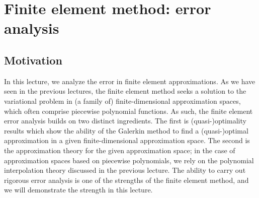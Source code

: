 \chapter{Finite element method: error analysis}

\disclaimer

\section{Motivation}
In this lecture, we analyze the error in finite element approximations. As we have seen in the previous lectures, the finite element method seeks a solution to the variational problem in (a family of) finite-dimensional approximation spaces, which often comprise piecewise polynomial functions. As such, the finite element error analysis builds on two distinct ingredients. The first is (quasi-)optimality results which show the ability of the Galerkin method to find a (quasi-)optimal approximation in a given finite-dimensional approximation space.  The second is the approximation theory for the given approximation space; in the case of approximation spaces based on piecewise polynomials, we rely on the polynomial interpolation theory discussed in the previous lecture. The ability to carry out rigorous error analysis is one of the strengths of the finite element method, and we will demonstrate the strength in this lecture.

